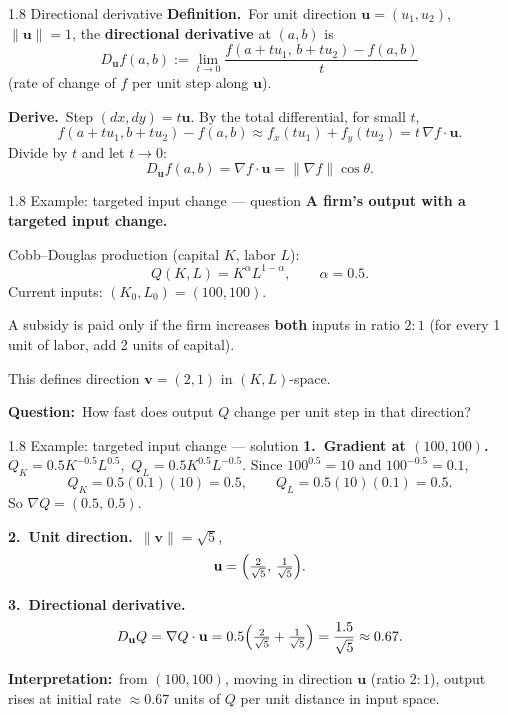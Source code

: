 \documentclass[11pt,aspectratio=169]{beamer}
\begin{document}
\begin{frame}{1.8 Directional derivative}
  \footnotesize
  \textbf{Definition.}\ For unit direction $\mathbf{u}=(u_1,u_2)$,
  $\|\mathbf{u}\|=1$, the \textbf{directional derivative} at $(a,b)$ is
  \[
    D_{\mathbf{u}}f(a,b)
    :=\lim_{t\to 0}\frac{f(a+tu_1,\,b+tu_2)-f(a,b)}{t}
  \]
  (rate of change of $f$ per unit step along $\mathbf{u}$).

  \medskip
  \textbf{Derive.}\ Step $(dx,dy)=t\mathbf{u}$. By the total differential,
  for small $t$,
  \[
    f(a+tu_1,b+tu_2)-f(a,b)
    \approx f_x(tu_1)+f_y(tu_2)
    =t\,\nabla f\cdot\mathbf{u}.
  \]
  Divide by $t$ and let $t\to 0$:
  \[
    D_{\mathbf{u}}f(a,b)=\nabla f\cdot\mathbf{u}
    =\|\nabla f\|\cos\theta.
  \]
\end{frame}

\begin{frame}{1.8 Example: targeted input change --- question}
  \footnotesize
  \textbf{A firm's output with a targeted input change.}

  \medskip
  Cobb--Douglas production (capital $K$, labor $L$):
  \[
    Q(K,L)=K^{\alpha}L^{1-\alpha},\qquad \alpha=0.5.
  \]
  Current inputs: $(K_0,L_0)=(100,100)$.

  \medskip
  A subsidy is paid only if the firm increases \textbf{both} inputs in ratio
  $2{:}1$ (for every 1 unit of labor, add 2 units of capital).

  \medskip
  This defines direction $\mathbf{v}=(2,1)$ in $(K,L)$-space.

  \medskip
  \textbf{Question:}\ How fast does output $Q$ change per unit step in that
  direction?
\end{frame}

\begin{frame}{1.8 Example: targeted input change --- solution}
  \footnotesize
  \textbf{1.\ Gradient at $(100,100)$.}
  $Q_K=0.5K^{-0.5}L^{0.5}$,\ $Q_L=0.5K^{0.5}L^{-0.5}$.
  Since $100^{0.5}=10$ and $100^{-0.5}=0.1$,
  \[
    Q_K=0.5(0.1)(10)=0.5,\qquad Q_L=0.5(10)(0.1)=0.5.
  \]
  So $\nabla Q=(0.5,\,0.5)$.

  \medskip
  \textbf{2.\ Unit direction.}\ $\|\mathbf{v}\|=\sqrt{5}$,
  \[
    \mathbf{u}=\Bigl(\tfrac{2}{\sqrt{5}},\,\tfrac{1}{\sqrt{5}}\Bigr).
  \]

  \medskip
  \textbf{3.\ Directional derivative.}
  \[
    D_{\mathbf{u}}Q=\nabla Q\cdot\mathbf{u}
    =0.5\Bigl(\tfrac{2}{\sqrt{5}}+\tfrac{1}{\sqrt{5}}\Bigr)
    =\frac{1.5}{\sqrt{5}}\approx 0.67.
  \]

  \medskip
  {\scriptsize \textbf{Interpretation:}\ from $(100,100)$, moving in direction
  $\mathbf{u}$ (ratio $2{:}1$), output rises at initial rate
  $\approx 0.67$ units of $Q$ per unit distance in input space.}
\end{frame}
\end{document}
